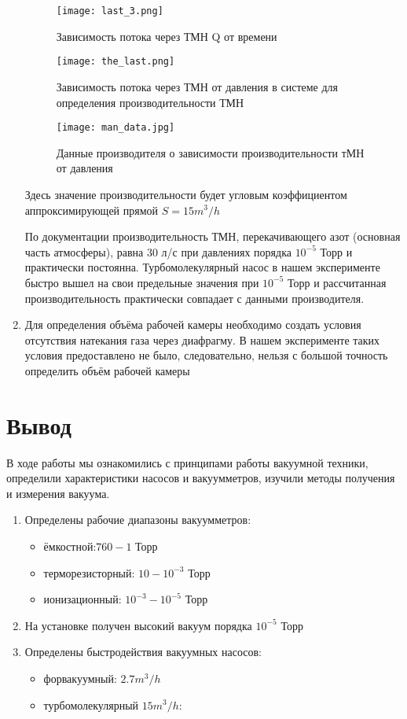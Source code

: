 \documentclass[a4paper]{article}
\begin{document}
\begin{enumerate}
  \begin{figure}[h]
    \centering
    \texttt{[image: last\_3.png]}
    \caption{Зависимость потока через ТМН Q от времени}
    \label{fig:vac}
\end{figure}

  \begin{figure}[h]
    \centering
    \texttt{[image: the\_last.png]}
    \caption{Зависимость потока через ТМН от давления в системе для определения производительности ТМН}
    \label{fig:vac}
\end{figure}

  \begin{figure}[h]
    \centering
    \texttt{[image: man\_data.jpg]}
    \caption{Данные производителя о зависимости производительности тМН от давления}
    \label{fig:vac}
\end{figure}

Здесь значение производительности будет угловым коэффициентом аппроксимирующей прямой $S = 15 m^3/h$

По документации производительность ТМН, перекачивающего азот (основная часть атмосферы), равна 30 л/с при давлениях порядка $10^{-5}$ Торр и практически постоянна. Турбомолекулярный насос в нашем эксперименте быстро вышел на свои предельные значения при $10^{-5}$ Торр и рассчитанная производительность практически совпадает с данными производителя.

\item Для определения объёма рабочей камеры необходимо создать условия отсутствия натекания газа через диафрагму. В нашем эксперименте таких условия предоставлено не было, следовательно, нельзя с большой точность определить объём рабочей камеры
\end{enumerate}

\section {Вывод}
В ходе работы мы ознакомились с принципами работы вакуумной техники, определили характеристики насосов и вакуумметров, изучили методы получения и измерения вакуума. 
\begin{enumerate}
\item Определены рабочие диапазоны вакуумметров:
\begin{itemize}
  \item ёмкостной:$760 - 1$ Торр
  \item терморезисторный: $10 - 10^{-3} $ Торр
  \item ионизационный: $10^{-3} - 10^{-5}$ Торр
\end{itemize}
\item На установке получен высокий вакуум порядка $10^{-5}$ Торр
\item Определены быстродействия вакуумных насосов:
\begin{itemize}
  \item форвакуумный: $2.7 m^3/h$
  \item турбомолекулярный $15 m^3/h$: 
\end{itemize}
\end{enumerate}
\end{document}
